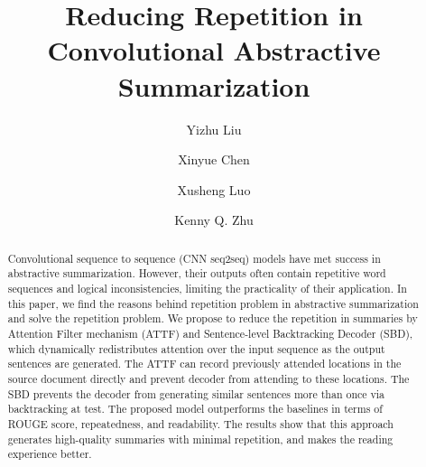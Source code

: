 \documentclass{nle}
\theoremstyle{definition}
\begin{document}
\label{firstpage}




\title{Reducing Repetition in Convolutional Abstractive Summarization}

\begin{authgrp}
\author{Yizhu Liu}
\author{Xinyue Chen}
\author{Xusheng Luo}
\author{ Kenny Q. Zhu}
\end{authgrp}


\begin{abstract}
Convolutional sequence to sequence (CNN seq2seq) models have met success in abstractive summarization. However, their outputs often contain repetitive word sequences and logical inconsistencies,
limiting the practicality of their application. 
In this paper, we find the reasons behind repetition problem in abstractive summarization and solve the repetition problem.
We propose to reduce the repetition in summaries by 
Attention Filter mechanism (ATTF) and Sentence-level Backtracking Decoder (SBD),
which dynamically redistributes attention over the input sequence 
as the output sentences are generated. 
The ATTF can record previously attended locations in the source document directly and prevent decoder from attending to these locations. The SBD prevents the decoder from generating similar sentences more than once via backtracking at test.
The proposed model outperforms the baselines 
in terms of ROUGE score, repeatedness, and readability. 
The results show that this approach 
generates high-quality summaries with minimal repetition,
and makes the reading experience better.
\end{abstract}
\end{document}
